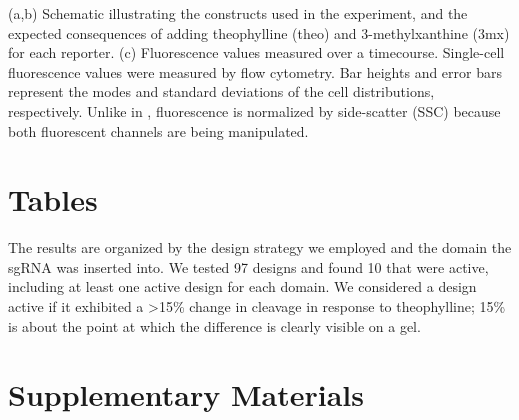 \documentclass[10pt,oneside]{article}
\begin{document}


 (a,b) Schematic illustrating the constructs used in the experiment, and the 
 expected consequences of adding theophylline (theo) and 3-methylxanthine (3mx) 
 for each reporter.
 (c) Fluorescence values measured over a  timecourse.  Single-cell 
 fluorescence values were measured by flow cytometry.  Bar heights and error 
 bars represent the modes and standard deviations of the cell distributions, 
 respectively.  Unlike in , fluorescence is normalized by 
 side-scatter (SSC) because both fluorescent channels are being manipulated.

\section{Tables}



   The results are organized by 
 the design strategy we employed and the domain the sgRNA was inserted into.  
 We tested 97 designs and found 10 that were active, including at least one 
 active design for each domain.  We considered a design active if it exhibited 
 a >15\% change in cleavage in response to theophylline; 15\% is about the 
 point at which the difference is clearly visible on a gel.

\section{Supplementary Materials}


\end{document}
